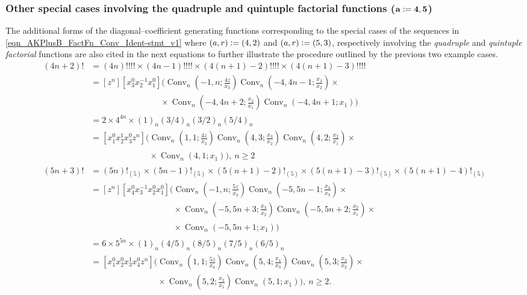 \documentclass[12pt,reqno]{article}
\numberwithin{sfootnote}{section}
\numberwithin{equation}{section}
\theoremstyle{DefaultTheoremStyle}
\theoremstyle{definition}
\newcommand{\defequals}{\ensuremath{\vcentcolon=}}
\newcommand{\Pochhammer}[2]{\ensuremath{\left(#1\right)_{#2}}}
\newcommand{\ConvGF}[4]{\ensuremath{\Conv_{#1}\left(#2, #3; #4\right)}}
\DeclareMathOperator{\Conv}{Conv}
\begin{document}
\subsubsection{Other special cases involving the 
               quadruple and quintuple factorial functions 
               ($\mathbf{a \defequals 4,5}$)} 
The additional forms of the diagonal--coefficient generating functions 
corresponding to the special cases of the sequences in 
\eqref{eqn_AKPlusB_FactFn_Conv_Ident-stmt_v1} where 
$(a, r) \defequals (4, 2)$ and $(a, r) \defequals (5, 3)$, respectively 
involving the \emph{quadruple} and \emph{quintuple factorial} functions 
are also cited in the next equations to further illustrate the procedure 
outlined by the previous two example cases. 
\begin{align*} 
(4n+2)! & = (4n)!!!! \times (4n-1)!!!! \times (4(n+1)-2)!!!! \times 
            (4(n+1)-3)!!!! \\ 
      & = [z^n] [x_3^{0} x_2^{-1} x_1^0] \Biggl( 
          \ConvGF{n}{-1}{n}{\frac{4z}{x_3}} 
          \ConvGF{n}{-4}{4n-1}{\frac{x_3}{x_2}} \times \\ 
      & \phantom{= [z^n] [x_3^{0} x_2^0 x_1^0] \Biggl(} \times 
          \ConvGF{n}{-4}{4n+2}{\frac{x_2}{x_1}} 
          \ConvGF{n}{-4}{4n+1}{x_1} 
          \Biggr) \\ 
      & = 
      2 \times 4^{4n} \times 
      \Pochhammer{1}{n} \Pochhammer{3/4}{n} 
      \Pochhammer{3/2}{n} \Pochhammer{5/4}{n} \\ 
      & = [x_1^0 x_2^1 x_3^0 z^n] \Biggl( 
          \ConvGF{n}{1}{1}{\frac{4z}{x_3}} 
          \ConvGF{n}{4}{3}{\frac{x_3}{x_2}} 
          \ConvGF{n}{4}{2}{\frac{x_2}{x_1}} \times \\ 
      & \phantom{= [x_1^0 x_2^1 x_3^0 z^n] \Biggl(} \times 
          \ConvGF{n}{4}{1}{x_1} 
          \Biggr),\ n \geq 2 \\ 
(5n+3)! & = (5n)!_{(5)} \times (5n-1)!_{(5)} \times (5(n+1)-2)!_{(5)} \times 
            (5(n+1)-3)!_{(5)} \times (5(n+1)-4)!_{(5)} \\ 
        & = [z^n] [x_4^0 x_3^{-1} x_2^0 x_1^0] \Biggl( 
            \ConvGF{n}{-1}{n}{\frac{5z}{x_4}} 
            \ConvGF{n}{-5}{5n-1}{\frac{x_4}{x_3}} \times \\ 
        & \phantom{= [z^n] [x_4^0 x_3^{-1} x_2^0 x_1^0] \Biggl( } \times 
            \ConvGF{n}{-5}{5n+3}{\frac{x_3}{x_2}} 
            \ConvGF{n}{-5}{5n+2}{\frac{x_2}{x_1}} \times \\ 
        & \phantom{= [z^n] [x_4^0 x_3^{-1} x_2^0 x_1^0] \Biggl( } \times 
            \ConvGF{n}{-5}{5n+1}{x_1} 
            \Biggr) \\ 
      & = 
      6 \times 5^{5n} \times 
      \Pochhammer{1}{n} \Pochhammer{4/5}{n} \Pochhammer{8/5}{n} 
      \Pochhammer{7/5}{n} \Pochhammer{6/5}{n} \\ 
      & = [x_1^0 x_2^0 x_3^1 x_4^0 z^n] \Biggl( 
          \ConvGF{n}{1}{1}{\frac{5z}{x_4}} 
          \ConvGF{n}{5}{4}{\frac{x_4}{x_3}} 
          \ConvGF{n}{5}{3}{\frac{x_3}{x_2}} \times \\ 
      & \phantom{= [x_1^0 x_2^0 x_3^1 x_4^0 z^n] \Biggl(} \times 
          \ConvGF{n}{5}{2}{\frac{x_2}{x_1}} 
          \ConvGF{n}{5}{1}{x_1} 
          \Biggr),\ n \geq 2. 
\end{align*} 
\end{document}
